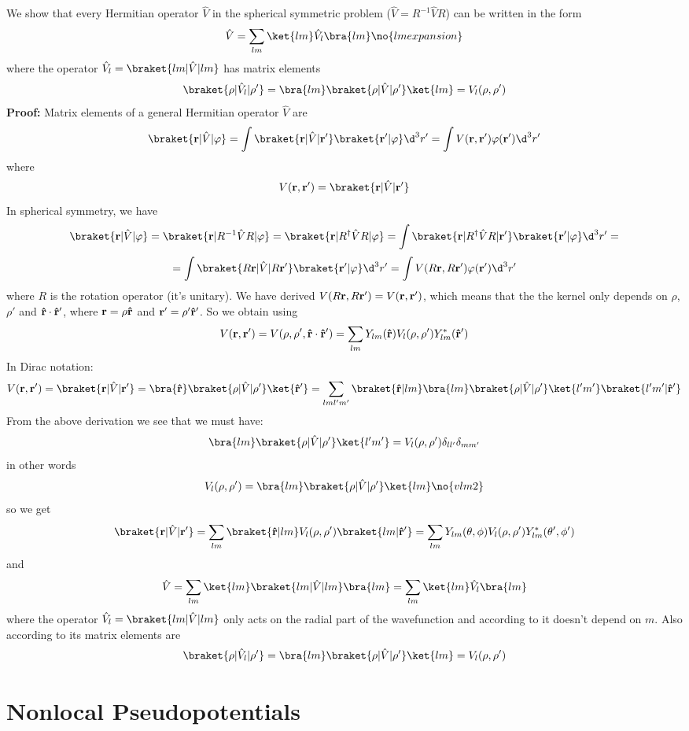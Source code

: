 We show that every Hermitian operator $\hat V$ in the spherical symmetric
problem ($\hat V=R^{-1}\hat VR$) can be written in the form
$$\hat V=\sum_{lm}\ket{lm}\hat V_l\bra{lm}\no{lmexpansion}$$
where the operator $\hat V_l=\braket{lm|\hat V|lm}$ has matrix elements
$$\braket{\rho|\hat V_l|\rho'}=\bra{lm}\braket{\rho|\hat V|\rho'}\ket{lm}=
V_l(\rho,\rho')$$
{\bf Proof:} Matrix elements of a general Hermitian operator $\hat V$ are
$$\braket{{\bf r}|\hat V|\varphi}=
\int\braket{{\bf r}|\hat V|{\bf r'}}\braket{{\bf r'}|\varphi}\d^3r'=
\int V({\bf r},{\bf r'})\varphi({\bf r'})\d^3r'$$
where
$$V({\bf r}, {\bf r'})=\braket{{\bf r}|\hat V|{\bf r'}}$$ 
In spherical symmetry, we have 
$$\braket{{\bf r}|\hat V|\varphi}
=\braket{{\bf r}|R^{-1}\hat VR|\varphi}
=\braket{{\bf r}|R^{\dagger}\hat VR|\varphi}
=\int\braket{{\bf r}|R^{\dagger}\hat VR|{\bf r'}}\braket{{\bf r'}|\varphi}\d^3r'
=
$$
$$
=\int\braket{R{\bf r}|\hat V|R{\bf r'}}\braket{{\bf r'}|\varphi}\d^3r'
=\int V(R{\bf r},R{\bf r'})\varphi({\bf r'})\d^3r'
$$
where $R$ is the rotation operator (it's unitary). We have derived 
$V(R{\bf r},R{\bf r'})=V({\bf r},{\bf r'})$, which means that the
the kernel only depends on $\rho$, $\rho'$ and 
${\bf\hat r}\cdot{\bf\hat r'}$, where ${\bf r}=\rho{\bf\hat r}$ and
${\bf r'}=\rho'{\bf\hat r'}$. So we obtain using 
$$V({\bf r}, {\bf r'})=V(\rho,\rho',{\bf\hat r}\cdot{\bf\hat r'})=
\sum_{lm}  Y_{lm}({\bf\hat r}) V_l(\rho,\rho')
Y_{lm}^*({\bf\hat r'})$$
In Dirac notation:
$$V({\bf r}, {\bf r'})=\braket{{\bf r}|\hat V|{\bf r'}}
=\bra{\bf\hat r}\braket{\rho|\hat V|\rho'}\ket{\bf\hat r'}
=\sum_{lml'm'}\braket{{\bf\hat r}|lm}\bra{lm}\braket{\rho|\hat V|\rho'}
\ket{l'm'}\braket{l'm'|\bf\hat r'}
$$
From the above derivation we see that we must have:
$$\bra{lm}\braket{\rho|\hat V|\rho'}\ket{l'm'}=
V_l(\rho,\rho')\delta_{ll'}\delta_{mm'}$$
in other words
$$V_l(\rho,\rho')=\bra{lm}\braket{\rho|\hat V|\rho'}\ket{lm} \no{vlm2}$$
so we get
$$\braket{{\bf r}|\hat V|{\bf r'}}
=\sum_{lm}\braket{{\bf\hat r}|lm}V_l(\rho,\rho')\braket{lm|\bf\hat r'}
=\sum_{lm}Y_{lm}(\theta,\phi) V_l(\rho,\rho') Y_{lm}^*(\theta',\phi')
$$
and
$$\hat V 
=\sum_{lm}\ket{lm}\braket{lm|\hat V|lm}\bra{lm} 
=\sum_{lm}\ket{lm}\hat V_l\bra{lm} 
$$
where the operator $\hat V_l=\braket{lm|\hat V|lm}$ only acts on the radial
part of the wavefunction and according to  it doesn't depend on
$m$. Also according to  its matrix elements are
$$\braket{\rho|\hat V_l|\rho'}=\bra{lm}\braket{\rho|\hat V|\rho'}\ket{lm}=
V_l(\rho,\rho')$$

\section{Nonlocal Pseudopotentials}

